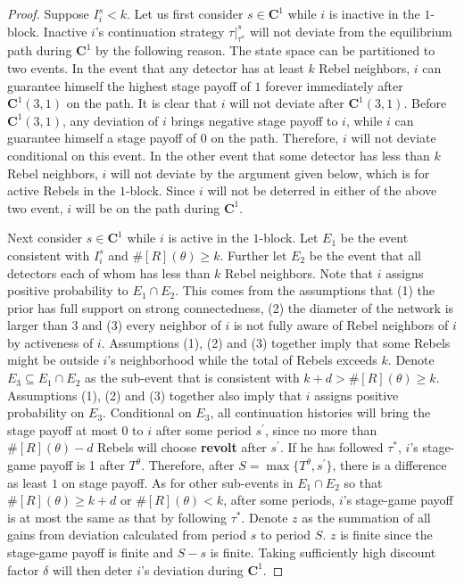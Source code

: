 \documentclass[12pt,letter]{article}
\newcommand{\Kappa}{\mathbf{C}}
\theoremstyle{definition}
\theoremstyle{remark}
\theoremstyle{claim}
\begin{document}
\begin{proof}
Suppose $I^s_i< k$. Let us first consider $s\in \Kappa^1$ while $i$ is inactive in the $1$-block. Inactive $i$'s continuation strategy $\tau|^s_{\tau^{*}}$ will not deviate from the equilibrium path during $\Kappa^1$ by the following reason. The state space can be partitioned to two events. In the event that any detector has at least $k$ Rebel neighbors, $i$ can guarantee himself the highest stage payoff of $1$ forever immediately after $\Kappa^1(3,1)$ on the path. It is clear that $i$ will not deviate after $\Kappa^1(3,1)$. Before $\Kappa^1(3,1)$, any deviation of $i$ brings negative stage payoff to $i$, while $i$ can guarantee himself a stage payoff of $0$ on the path. Therefore, $i$ will not deviate conditional on this event. In the other event that some detector has less than $k$ Rebel neighbors, $i$ will not deviate by the argument given below, which is for active Rebels in the $1$-block. Since $i$ will not be deterred in either of the above two event, $i$ will be on the path during $\Kappa^1$.  

Next consider $s\in \Kappa^1$ while $i$ is active in the $1$-block. Let $E_1$ be the event consistent with $I^s_i$ and $\#[R](\theta)\geq k$. Further let $E_2$ be the event that all detectors each of whom has less than $k$ Rebel neighbors. Note that $i$ assigns positive probability to $E_1\cap E_2$. This comes from the assumptions that (1) the prior has full support on strong connectedness, (2) the diameter of the network is larger than 3 and (3) every neighbor of $i$ is not fully aware of Rebel neighbors of $i$ by activeness of $i$. Assumptions (1), (2) and (3) together imply that some Rebels might be outside $i$'s neighborhood while the total of Rebels exceeds $k$. Denote $E_3\subseteq E_1\cap E_2$ as the sub-event that is consistent with $k+d>\#[R](\theta)\geq k$. Assumptions (1), (2) and (3) together also imply that $i$ assigns positive probability on $E_3$. Conditional on $E_3$, all continuation histories will bring the stage payoff at most 0 to $i$ after some period $s^{'}$, since no more than $\#[R](\theta)-d$ Rebels will choose \textbf{revolt} after $s^{'}$. If he has followed $\tau^{*}$, $i$'s stage-game payoff is 1 after $T^{\theta}$. Therefore, after $S=\max\{T^{\theta}, s^{'}\}$, there is a difference as least $1$ on stage payoff. As for other sub-events in $E_1\cap E_2$ so that $\#[R](\theta)\geq k+d$ or $\#[R](\theta)<k$, after some periods, $i$'s stage-game payoff is at most the same as that by following $\tau^{*}$. Denote $z$ as the summation of all gains from deviation calculated from period $s$ to period $S$. $z$ is finite since the stage-game payoff is finite and $S-s$ is finite. Taking sufficiently high discount factor $\delta$ will then deter $i$'s deviation during $\Kappa^1$. 


\end{proof}
\end{document}
